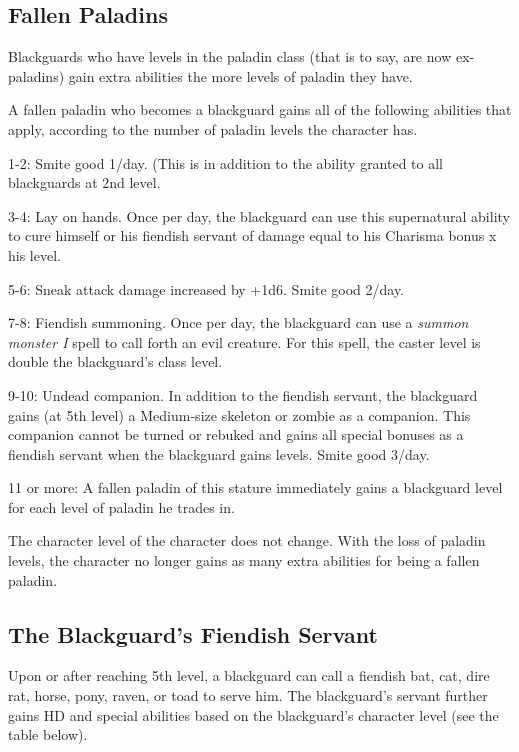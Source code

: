 \documentclass{article}
\begin{document}
\subsection*{\textbf{Fallen Paladins}}

Blackguards who have levels in the paladin class (that is to say, are now ex-paladins) 
gain extra abilities the more levels of paladin they have.

A fallen paladin who becomes a blackguard gains all of the following abilities 
that apply, according to the number of paladin levels the character has.

1-2: Smite good 1/day. (This is in addition to the ability granted to all blackguards 
at 2nd level.

3-4: Lay on hands. Once per day, the blackguard can use this supernatural ability 
to cure himself or his fiendish servant of damage equal to his Charisma bonus x 
his level.

5-6: Sneak attack damage increased by +1d6. Smite good 2/day.

7-8: Fiendish summoning. Once per day, the blackguard can use a \textit{summon 
monster I }spell to call forth an evil creature. For this spell, the caster level 
is double the blackguard's class level.

9-10: Undead companion. In addition to the fiendish servant, the blackguard gains 
(at 5th level) a Medium-size skeleton or zombie as a companion. This companion 
cannot be turned or rebuked and gains all special bonuses as a fiendish servant 
when the blackguard gains levels. Smite good 3/day.

11 or more: A fallen paladin of this stature immediately gains a blackguard level 
for each level of paladin he trades in. 

The character level of the character does not change. With the loss of paladin 
levels, the character no longer gains as many extra abilities for being a fallen 
paladin. 

\vspace{12pt}
\subsection*{\textbf{The Blackguard's Fiendish Servant}}

Upon or after reaching 5th level, a blackguard can call a fiendish bat, cat, dire 
rat, horse, pony, raven, or toad to serve him. The blackguard's servant further 
gains HD and special abilities based on the blackguard's character level (see the 
table below).
\end{document}
